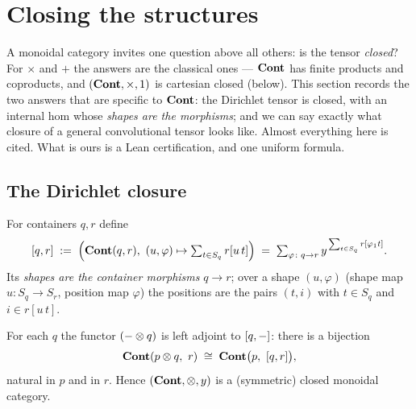 \section{Closing the structures}
\label{sec:closed}

A monoidal category invites one question above all others: is the tensor
\emph{closed}? For $\times$ and $+$ the answers are the classical ones --- $\mathbf{Cont}$
has finite products and coproducts, and $(\mathbf{Cont},\times,1)$ is cartesian closed
(below). This section records the two answers that are specific to $\mathbf{Cont}$: the
Dirichlet tensor is closed, with an internal hom whose \emph{shapes are the
morphisms}; and we can say exactly what closure of a general convolutional tensor
looks like. Almost everything here is cited. What is ours is a Lean
certification, and one uniform formula.

\subsection{The Dirichlet closure}

\begin{Definition}\label{def:ihom}
For containers $q,r$ define
\[
   \ihom qr\;:=\;\Bigl(\Cont(q,r),\ (u,\varphi)\mapsto
     \textstyle\sum_{t\in S_q} r[u\,t]\Bigr)
   \;=\;\sum_{\varphi\colon q\to r} y^{\,\sum_{t\in S_q} r[\varphi_1 t]} .
\]
Its \emph{shapes are the container morphisms} $q\to r$; over a shape $(u,\varphi)$
(shape map $u\colon S_q\to S_r$, position map $\varphi$) the positions are the
pairs $(t,i)$ with $t\in S_q$ and $i\in r[u\,t]$.
\end{Definition}

\begin{Theorem}\label{thm:dirclosed}
For each $q$ the functor $(-\mathbin{\otimes} q)$ is left adjoint to $[q,-]$: there is a
bijection
\[
   \Cont(p\dir q,\ r)\;\cong\;\Cont\bigl(p,\ \ihom qr\bigr),
\]
natural in $p$ and in $r$. Hence $(\mathbf{Cont},\mathbin{\otimes},y)$ is a (symmetric) closed
monoidal category.
\end{Theorem}

